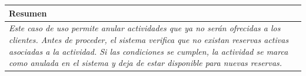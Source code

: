     \begin{table}[H]
        \begin{tabular}{llllllll}
        \hline
        \multicolumn{8}{|l|}{\cellcolor[HTML]{F2F2F2}Resumen}                                                                                                                                                                                                                                                                                                                                                                                             \\ \hline
        \multicolumn{8}{|p{15cm}|}{{\color[HTML]{808080} \textit{Este caso de uso permite anular actividades que ya no serán ofrecidas a los clientes. Antes de proceder, el sistema verifica que no existan reservas activas asociadas a la actividad. Si las condiciones se cumplen, la actividad se marca como anulada en el sistema y deja de estar disponible para nuevas reservas.}}} \\ \hline
        \end{tabular}
    \end{table}

